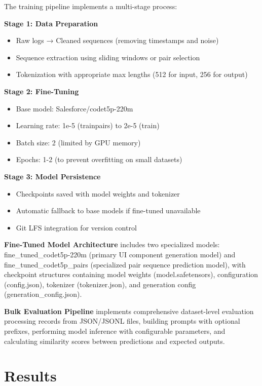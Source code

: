 \documentclass[12pt,a4paper]{article}
\begin{document}
The training pipeline implements a multi-stage process:

\textbf{Stage 1: Data Preparation}
\begin{itemize}
\item Raw logs → Cleaned sequences (removing timestamps and noise)
\item Sequence extraction using sliding windows or pair selection
\item Tokenization with appropriate max lengths (512 for input, 256 for output)
\end{itemize}

\textbf{Stage 2: Fine-Tuning}
\begin{itemize}
\item Base model: Salesforce/codet5p-220m
\item Learning rate: 1e-5 (trainpairs) to 2e-5 (train)
\item Batch size: 2 (limited by GPU memory)
\item Epochs: 1-2 (to prevent overfitting on small datasets)
\end{itemize}

\textbf{Stage 3: Model Persistence}
\begin{itemize}
\item Checkpoints saved with model weights and tokenizer
\item Automatic fallback to base models if fine-tuned unavailable
\item Git LFS integration for version control
\end{itemize}

\textbf{Fine-Tuned Model Architecture} includes two specialized models: fine_tuned_codet5p-220m (primary UI component generation model) and fine_tuned_codet5p_pairs (specialized pair sequence prediction model), with checkpoint structures containing model weights (model.safetensors), configuration (config.json), tokenizer (tokenizer.json), and generation config (generation_config.json).

\textbf{Bulk Evaluation Pipeline} implements comprehensive dataset-level evaluation processing records from JSON/JSONL files, building prompts with optional prefixes, performing model inference with configurable parameters, and calculating similarity scores between predictions and expected outputs.

\section{Results}
\end{document}

